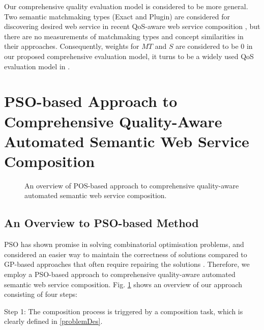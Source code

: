 \documentclass{llncs}
\begin{document}
Our comprehensive quality evaluation model is considered to be more general. Two semantic matchmaking types (Exact and Plugin) are considered for discovering desired web service in recent QoS-aware web service composition  \cite{ma2015hybrid,da2016particle,da2015graphevol}, but there are no measurements of matchmaking types and concept similarities in their approaches. Consequently, weights for $MT$ and $S$ are considered to be 0 in our proposed comprehensive evaluation model, it turns to be a widely used QoS evaluation model in \cite{ma2015hybrid,da2016particle,da2015graphevol}.


\section{PSO-based Approach to Comprehensive Quality-Aware Automated Semantic Web Service Composition}\label{qswsc_approach}

\begin{figure}[h]
\centering
{}
 \caption{An overview of POS-based approach to comprehensive quality-aware automated semantic web service composition.}
 \label{overview}
\end{figure}


\subsection{An Overview to PSO-based Method}\label{PSO_based_approach}

PSO has shown promise in solving combinatorial optimisation problems, and considered an easier way to maintain the correctness of solutions compared to GP-based approaches that often require repairing the solutions \cite{da2016particle}. Therefore, we employ a PSO-based approach to comprehensive quality-aware automated semantic web service composition. Fig. \ref{overview} shows an overview of our approach consisting of four steps: 

Step 1: The composition process is triggered by a composition task, which is clearly defined in \ref{problemDes}. 
\end{document}
